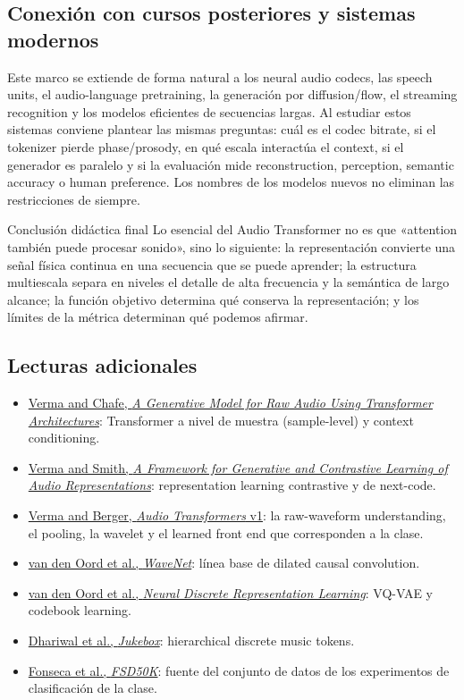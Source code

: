 \subsection{Conexión con cursos posteriores y sistemas modernos}

Este marco se extiende de forma natural a los neural audio codecs, las speech units, el audio-language pretraining, la generación por diffusion/flow, el streaming recognition y los modelos eficientes de secuencias largas. Al estudiar estos sistemas conviene plantear las mismas preguntas: cuál es el codec bitrate, si el tokenizer pierde phase/prosody, en qué escala interactúa el context, si el generador es paralelo y si la evaluación mide reconstruction, perception, semantic accuracy o human preference. Los nombres de los modelos nuevos no eliminan las restricciones de siempre.

\begin{importantbox}{Conclusión didáctica final}
Lo esencial del Audio Transformer no es que «attention también puede procesar sonido», sino lo siguiente: la representación convierte una señal física continua en una secuencia que se puede aprender; la estructura multiescala separa en niveles el detalle de alta frecuencia y la semántica de largo alcance; la función objetivo determina qué conserva la representación; y los límites de la métrica determinan qué podemos afirmar.
\end{importantbox}

\subsection{Lecturas adicionales}

\begin{itemize}
  \item \href{https://arxiv.org/abs/2106.16036}{Verma and Chafe, \emph{A Generative Model for Raw Audio Using Transformer Architectures}}: Transformer a nivel de muestra (sample-level) y context conditioning.
  \item \href{https://arxiv.org/abs/2010.11459}{Verma and Smith, \emph{A Framework for Generative and Contrastive Learning of Audio Representations}}: representation learning contrastive y de next-code.
  \item \href{https://arxiv.org/abs/2105.00335v1}{Verma and Berger, \emph{Audio Transformers} v1}: la raw-waveform understanding, el pooling, la wavelet y el learned front end que corresponden a la clase.
  \item \href{https://arxiv.org/abs/1609.03499}{van den Oord et al., \emph{WaveNet}}: línea base de dilated causal convolution.
  \item \href{https://arxiv.org/abs/1711.00937}{van den Oord et al., \emph{Neural Discrete Representation Learning}}: VQ-VAE y codebook learning.
  \item \href{https://arxiv.org/abs/2005.00341}{Dhariwal et al., \emph{Jukebox}}: hierarchical discrete music tokens.
  \item \href{https://arxiv.org/abs/2010.00475}{Fonseca et al., \emph{FSD50K}}: fuente del conjunto de datos de los experimentos de clasificación de la clase.
\end{itemize}


